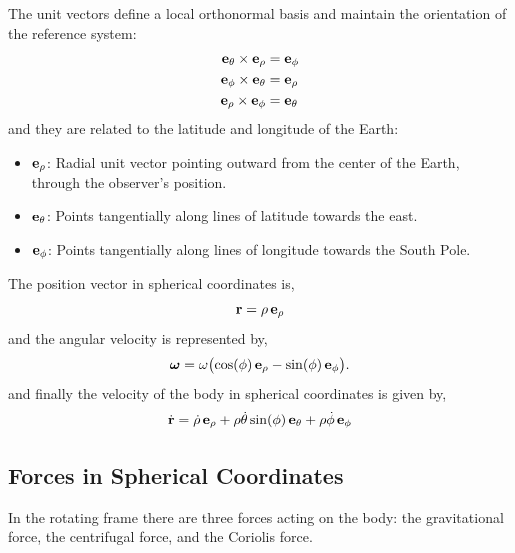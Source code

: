\documentclass[12pt]{article}
\begin{document}
The unit vectors define a local orthonormal basis and maintain the orientation of the
reference system:
\begin{align}
  \vb{e}_\theta \times \vb{e}_\rho &= \vb{e}_\phi \\
  \vb{e}_\phi   \times \vb{e}_\theta &= \vb{e}_\rho \\
  \vb{e}_\rho   \times \vb{e}_\phi &= \vb{e}_\theta
\end{align}
and they are related to the latitude and longitude of the Earth:
\begin{itemize}
  \item $\vb{e}_\rho$: Radial unit vector pointing outward from the center of the Earth,
        through the observer's position.
  \item $\vb{e}_\theta$: Points tangentially along lines of latitude towards the east.
  \item $\vb{e}_\phi$: Points tangentially along lines of longitude towards the South Pole.
\end{itemize}

The position vector in spherical coordinates is,
\begin{equation}
  \vb{r} = \rho\,\vb{e}_\rho
\end{equation}
and the angular velocity is represented by,
\begin{equation}
  \boldsymbol{\omega} = \omega\bigl(\cos(\phi)\,\vb{e}_\rho - \sin(\phi)\,\vb{e}_\phi\bigr).
\end{equation}
and finally the velocity of the body in spherical coordinates is given by,
\begin{equation}
  \dot{\vb{r}} = \dot\rho\,\vb{e}_\rho + \rho\dot\theta\sin(\phi)\,\vb{e}_\theta
    + \rho\dot\phi\,\vb{e}_\phi
\end{equation}

\subsection{Forces in Spherical Coordinates}

In the rotating frame there are three forces acting on the body: the gravitational force, the
centrifugal force, and the Coriolis force.
\end{document}
